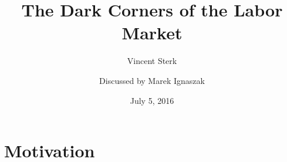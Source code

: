 


\title{The Dark Corners of the Labor Market}
\subtitle{Vincent Sterk}
\author{Discussed by Marek Ignaszak}
\date{July 5, 2016}





\begin{frame}
    \titlepage
\end{frame}


\section*{Motivation}


\appendix



